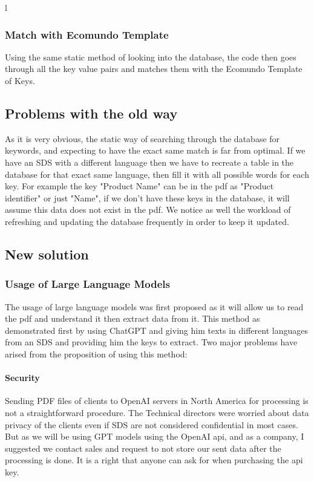 l\documentclass[a4paper,12pt,twoside]{report}
\begin{document}
\subsubsection{Match with Ecomundo Template}
Using the same static method of looking into the database, the code then goes through all the key value pairs and matches them with the Ecomundo Template of Keys. 
\subsection{Problems with the old way}
As it is very obvious, the static way of searching through the database for keywords, and expecting to have the exact same match is far from optimal. If we have an SDS with a different language then we have to recreate a table in the database for that exact same language, then fill it with all possible words for each key. For example the key "Product Name" can be in the pdf as "Product identifier" or just "Name", if we don't have these keys in the database, it will assume this data does not exist in the pdf.
We notice as well the workload of refreshing and updating the database frequently in order to keep it updated.
\subsection{New solution}
\subsubsection{Usage of Large Language Models}
The usage of large language models was first proposed as it will allow us to read the pdf and understand it then extract data from it. This method as demonstrated first by using ChatGPT and giving him texts in different languages from an SDS and providing him the keys to extract. Two major problems have arised from the proposition of using this method:
\paragraph{Security}
Sending PDF files of clients to OpenAI servers in North America for processing is not a straightforward procedure. The Technical directors were worried about data privacy of the clients even if SDS are not considered confidential in most cases. But as we will be using GPT models using the OpenAI api, and as a company, I suggested we contact sales and request to not store our sent data after the processing is done. It is a right that anyone can ask for when purchasing the api key\cite{openaiUP}.
\end{document}
